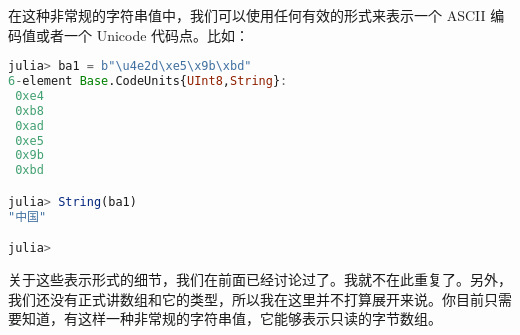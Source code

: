 在这种非常规的字符串值中，我们可以使用任何有效的形式来表示一个 ASCII 编码值或者一个 Unicode 代码点。比如：
\begin{lstlisting}[language=julia]
julia> ba1 = b"\u4e2d\xe5\x9b\xbd"
6-element Base.CodeUnits{UInt8,String}:
 0xe4
 0xb8
 0xad
 0xe5
 0x9b
 0xbd

julia> String(ba1)
"中国"

julia>
\end{lstlisting}

关于这些表示形式的细节，我们在前面已经讨论过了。我就不在此重复了。另外，我们还没有正式讲数组和它的类型，所以我在这里并不打算展开来说。你目前只需要知道，有这样一种非常规的字符串值，它能够表示只读的字节数组。

